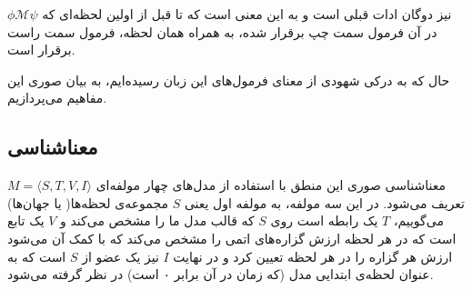 $\phi \mathcal{M} \psi$
نیز دوگان ادات قبلی است و به این معنی است که تا قبل از اولین لحظه‌ای که در آن فرمول سمت چپ برقرار شده، به همراه همان لحظه، فرمول سمت راست برقرار است.

\begin{center}
\end{center}


حال که به درکی شهودی از معنای فرمول‌های این زبان رسیده‌ایم، به بیان صوری این مفاهیم می‌پردازیم.

\subsection{معناشناسی }

معناشناسی صوری این منطق با استفاده از مدل‌های چهار مولفه‌ای 
$M=\langle S , T , V , I  \rangle$
تعریف می‌شود. در این سه مولفه، به مولفه اول یعنی $S$ مجموعه‌ی لحظه‌ها( یا جهان‌ها) می‌گوییم، ‌$T$ یک رابطه است روی $S$ که قالب مدل ما را مشخص می‌کند و $V$ یک تابع است که در هر لحظه ارزش گزاره‌های اتمی را مشخص می‌کند که با کمک آن می‌شود ارزش هر گزاره را در هر لحظه تعیین کرد و در نهایت $I$ نیز یک عضو از $S$ است که به عنوان لحظه‌ی ابتدایی مدل (که زمان در آن برابر ۰ است) در نظر گرفته می‌شود.

